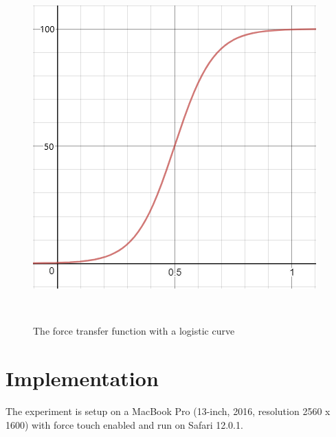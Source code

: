 \documentclass{sigchi}
\begin{document}
\begin{figure}[!h]
	\centering
	\includegraphics[width=0.8\columnwidth]{figures/Capture1}
	\caption{The force transfer function with a logistic curve}~\label{fig:figure2}
\end{figure}




\section{Implementation} 

%
%
The experiment is setup on a MacBook Pro (13-inch, 2016, resolution 2560 x 1600) with force touch enabled and run on Safari 12.0.1.
\end{document}
